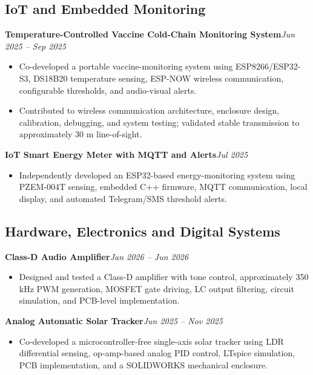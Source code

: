 \documentclass[10pt,a4paper]{article}
\newcommand{\gh}[1]{\href{#1}{\faGithub}}
\newcommand{\projecttitle}[3]{%
\textbf{#1}\hspace{3pt}#2\hfill\textit{#3}\\[-2pt]
}
\begin{document}
\subsection*{IoT and Embedded Monitoring}

\projecttitle{Temperature-Controlled Vaccine Cold-Chain Monitoring System}
{\gh{https://github.com/Abdul-Rahman-bme/Temperature-Controlled-Vaccine-Cooler}}
{Jun 2025 -- Sep 2025}
\begin{itemize}
    \item Co-developed a portable vaccine-monitoring system using ESP8266/ESP32-S3, DS18B20 temperature sensing, ESP-NOW wireless communication, configurable thresholds, and audio-visual alerts.
    \item Contributed to wireless communication architecture, enclosure design, calibration, debugging, and system testing; validated stable transmission to approximately 30 m line-of-sight.
\end{itemize}

\projecttitle{IoT Smart Energy Meter with MQTT and Alerts}
{\gh{https://github.com/Abdul-Rahman-bme/iot-smart-energy-meter}}
{Jul 2025}
\begin{itemize}
    \item Independently developed an ESP32-based energy-monitoring system using PZEM-004T sensing, embedded C++ firmware, MQTT communication, local display, and automated Telegram/SMS threshold alerts.
\end{itemize}

\subsection*{Hardware, Electronics and Digital Systems}

\projecttitle{Class-D Audio Amplifier}
{\gh{https://github.com/Abdul-Rahman-bme/class-d-audio-amplifier-radar}}
{Jan 2026 -- Jun 2026}
\begin{itemize}
    \item Designed and tested a Class-D amplifier with tone control, approximately 350 kHz PWM generation, MOSFET gate driving, LC output filtering, circuit simulation, and PCB-level implementation.
\end{itemize}

\projecttitle{Analog Automatic Solar Tracker}
{\gh{https://github.com/Abdul-Rahman-bme/Analog-Solar-Tracker}}
{Jun 2025 -- Nov 2025}
\begin{itemize}
    \item Co-developed a microcontroller-free single-axis solar tracker using LDR differential sensing, op-amp-based analog PID control, LTspice simulation, PCB implementation, and a SOLIDWORKS mechanical enclosure.
\end{itemize}
\end{document}
